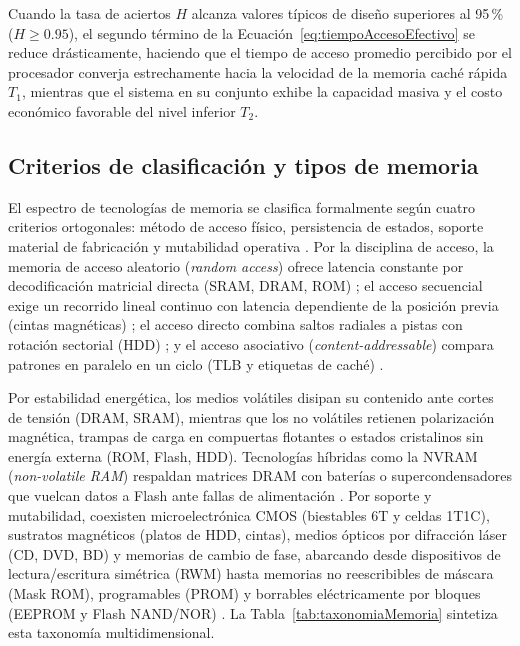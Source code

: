 \documentclass[12pt]{article}
\begin{document}
Cuando la tasa de aciertos $H$ alcanza valores típicos de diseño superiores al 95\,\% ($H \ge 0.95$), el segundo término de la Ecuación~\eqref{eq:tiempoAccesoEfectivo} se reduce drásticamente, haciendo que el tiempo de acceso promedio percibido por el procesador converja estrechamente hacia la velocidad de la memoria caché rápida $T_1$, mientras que el sistema en su conjunto exhibe la capacidad masiva y el costo económico favorable del nivel inferior $T_2$.

\subsection{Criterios de clasificación y tipos de memoria}
\label{sec:clasificacionTiposMemoria}

El espectro de tecnologías de memoria se clasifica formalmente según cuatro criterios ortogonales: método de acceso físico, persistencia de estados, soporte material de fabricación y mutabilidad operativa \parencites[\S 1.2, pp.\ 8--10]{silberschatz2006fundamentos}[\S 2.3, pp.\ 64--65]{deitel2004operating}. Por la disciplina de acceso, la memoria de acceso aleatorio (\textit{random access}) ofrece latencia constante por decodificación matricial directa (SRAM, DRAM, ROM) \parencite[\S 2.3, p.\ 65]{deitel2004operating}; el acceso secuencial exige un recorrido lineal continuo con latencia dependiente de la posición previa (cintas magnéticas) \parencite[\S 1.8, p.\ 21]{silberschatz2006fundamentos}; el acceso directo combina saltos radiales a pistas con rotación sectorial (HDD) \parencite[\S 1.8, p.\ 22]{silberschatz2006fundamentos}; y el acceso asociativo (\textit{content-addressable}) compara patrones en paralelo en un ciclo (TLB y etiquetas de caché) \parencite[\S 8.1, p.\ 384]{stallings2018operating}.

Por estabilidad energética, los medios volátiles disipan su contenido ante cortes de tensión (DRAM, SRAM), mientras que los no volátiles retienen polarización magnética, trampas de carga en compuertas flotantes o estados cristalinos sin energía externa (ROM, Flash, HDD). Tecnologías híbridas como la NVRAM (\textit{non-volatile RAM}) respaldan matrices DRAM con baterías o supercondensadores que vuelcan datos a Flash ante fallas de alimentación \parencite[\S 1.2, p.\ 9]{silberschatz2006fundamentos}. Por soporte y mutabilidad, coexisten microelectrónica CMOS (biestables 6T y celdas 1T1C), sustratos magnéticos (platos de HDD, cintas), medios ópticos por difracción láser (CD, DVD, BD) y memorias de cambio de fase, abarcando desde dispositivos de lectura/escritura simétrica (RWM) hasta memorias no reescribibles de máscara (Mask ROM), programables (PROM) y borrables eléctricamente por bloques (EEPROM y Flash NAND/NOR) \parencite[\S 1.2, pp.\ 8--10]{silberschatz2006fundamentos}. La Tabla~\ref{tab:taxonomiaMemoria} sintetiza esta taxonomía multidimensional.
\end{document}
